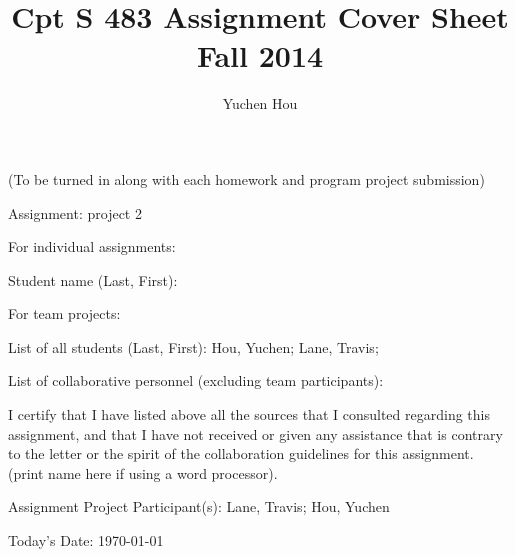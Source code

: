 \documentclass[12pt]{article}
\begin{document}
\title{Cpt S 483 Assignment Cover Sheet \\ Fall 2014}
\author{Yuchen Hou}
\maketitle

(To be turned in along with each homework and program project submission)

Assignment: project 2

For individual assignments:

Student name (Last, First):

For team projects:

List of all students (Last, First): Hou, Yuchen; Lane, Travis;

List of collaborative personnel (excluding team participants):

I certify that I have listed above all the sources that I consulted regarding this assignment, and that I have not received or given any assistance that is contrary to the letter or the spirit of the collaboration guidelines for this assignment. (print name here if using a word processor).

Assignment Project Participant(s): Lane, Travis; Hou, Yuchen

Today's Date: \today
\end{document}
